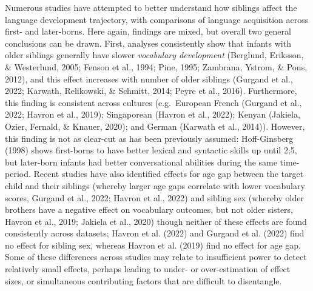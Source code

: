 \documentclass[
  man,floatsintext]{apa6}
\begin{document}
Numerous studies have attempted to better understand how siblings affect the language development trajectory, with comparisons of language acquisition across first- and later-borns. Here again, findings are mixed, but overall two general conclusions can be drawn. First, analyses consistently show that infants with older siblings generally have slower \emph{vocabulary development} (Berglund, Eriksson, \& Westerlund, 2005; Fenson et al., 1994; Pine, 1995; Zambrana, Ystrom, \& Pons, 2012), and this effect increases with number of older siblings (Gurgand et al., 2022; Karwath, Relikowski, \& Schmitt, 2014; Peyre et al., 2016). Furthermore, this finding is consistent across cultures (e.g.~European French (Gurgand et al., 2022; Havron et al., 2019); Singaporean (Havron et al., 2022); Kenyan (Jakiela, Ozier, Fernald, \& Knauer, 2020); and German (Karwath et al., 2014)). However, this finding is not as clear-cut as has been previously assumed: Hoff-Ginsberg (1998) shows first-borns to have better lexical and syntactic skills up until 2;5, but later-born infants had better conversational abilities during the same time-period. Recent studies have also identified effects for age gap between the target child and their siblings (whereby larger age gaps correlate with lower vocabulary scores, Gurgand et al., 2022; Havron et al., 2022) and sibling sex (whereby older brothers have a negative effect on vocabulary outcomes, but not older sisters, Havron et al., 2019; Jakiela et al., 2020) though neither of these effects are found consistently across datasets; Havron et al. (2022) and Gurgand et al. (2022) find no effect for sibling sex, whereas Havron et al. (2019) find no effect for age gap. Some of these differences across studies may relate to insufficient power to detect relatively small effects, perhaps leading to under- or over-estimation of effect sizes, or simultaneous contributing factors that are difficult to disentangle.
\end{document}
